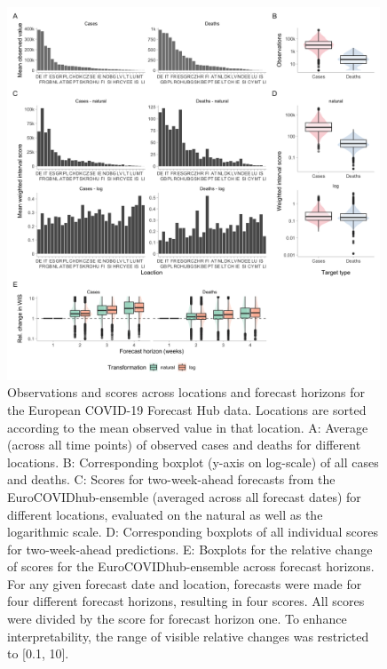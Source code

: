 \documentclass{article}
\begin{document}
\begin{figure}[h!]
    \centering
    \includegraphics[width=0.99\textwidth]{output/figures/HUB-mean-obs-location.png}
    \caption{Observations and scores across locations and forecast horizons for the European COVID-19 Forecast Hub data. Locations are sorted according to the mean observed value in that location. 
    A: Average (across all time points) of observed cases and deaths for different locations. B: Corresponding boxplot (y-axis on log-scale) of all cases and deaths. C: Scores for two-week-ahead forecasts from the EuroCOVIDhub-ensemble (averaged across all forecast dates) for different locations, evaluated on the natural as well as the logarithmic scale. D: Corresponding boxplots of all individual scores for two-week-ahead predictions. E: Boxplots for the relative change of scores for the EuroCOVIDhub-ensemble across forecast horizons. For any given forecast date and location, forecasts were made for four different forecast horizons, resulting in four scores. All scores were divided by the score for forecast horizon one. To enhance interpretability, the range of visible relative changes was restricted to [0.1, 10].}
    \label{fig:HUB-mean-locations}
\end{figure}
\end{document}
